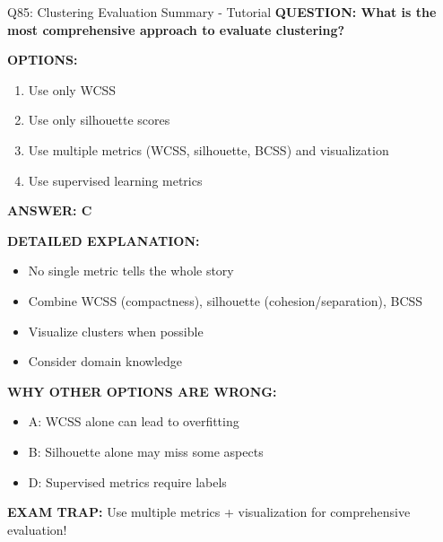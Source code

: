 \documentclass[8pt]{beamer}
\begin{document}
	\begin{frame}{Q85: Clustering Evaluation Summary - Tutorial}
		\fontsize{6.5}{7.5}\selectfont
		\textbf{QUESTION: What is the most comprehensive approach to evaluate clustering?}
		
		\vspace{0.1cm}
		\textbf{OPTIONS:}
		\begin{enumerate}
			\item Use only WCSS
			\item Use only silhouette scores
			\item Use multiple metrics (WCSS, silhouette, BCSS) and visualization
			\item Use supervised learning metrics
		\end{enumerate}
		
		\vspace{0.1cm}
		\textcolor{myblue}{\textbf{ANSWER: C}}
		
		\vspace{0.1cm}
		\textbf{DETAILED EXPLANATION:}
		\begin{itemize}
			\item No single metric tells the whole story
			\item Combine WCSS (compactness), silhouette (cohesion/separation), BCSS
			\item Visualize clusters when possible
			\item Consider domain knowledge
		\end{itemize}
		
		\vspace{0.1cm}
		\textcolor{myred}{\textbf{WHY OTHER OPTIONS ARE WRONG:}}
		\begin{itemize}
			\item \textcolor{myred}{A:} WCSS alone can lead to overfitting
			\item \textcolor{myred}{B:} Silhouette alone may miss some aspects
			\item \textcolor{myred}{D:} Supervised metrics require labels
		\end{itemize}
		
		\textcolor{myred}{\textbf{EXAM TRAP:}} Use \textcolor{myblue}{multiple metrics} + visualization for comprehensive evaluation!
	\end{frame}
	
	
\end{document}
